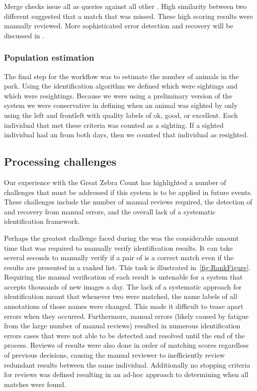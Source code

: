             Merge checks issue all \exemplars{} as queries against all other \exemplars{}. High similarity between
            two different \names{} suggested that a match that was missed. These high scoring results were manually
            reviewed. More sophisticated error detection and recovery will be discussed in .

        \subsubsection{Population estimation}
            The final step for the \GZC{} workflow was to estimate the number of animals in the park.
            Using the identification algorithm we defined which \annots{} were sightings and which were
              resightings.
            Because we were using a preliminary version of the system we were conservative in defining when an
              animal was sighted by only using the left and frontleft \annots{} with quality labels of ok, good, or
              excellent.
            Each individual that met these criteria was counted as a sighting.
            If a sighted individual had an \annot{} from both days, then we counted that individual as resighted.

    \subsection{Processing challenges}
        Our experience with the Great Zebra Count has highlighted a number of challenges that must be addressed if this
        system is to be applied in future events. These challenges include the number of manual reviews required, the
        detection of and recovery from manual errors, and the overall lack of a systematic identification framework.

        Perhaps the greatest challenge faced during the \GZC{} was the
          considerable amount time that was required to manually verify
          identification results.
        It can take several seconds to manually verify if a pair of \annots{}
          is a correct match even if the results are presented in a ranked list.
        This task is illustrated in~\cref{fig:RankFigure}.
        Requiring the manual verification of each result is untenable for a
          system that accepts thousands of new images a day.
        The lack of a systematic approach for identification meant that
          whenever two \annots{} were matched, the name labels of all
          annotations of those names were changed.
        This made it difficult to tease apart errors when they occurred.
        Furthermore, manual errors (likely caused by fatigue from the large
          number of manual reviews) resulted in numerous identification errors
          cases that were not able to be detected and resolved until the end of
          the process.
        Reviews of results were also done in order of matching scores
          regardless of previous decisions, causing the manual reviewer to
          inefficiently review redundant results between the same individual.
        Additionally no stopping criteria for reviews was defined resulting in
          an ad-hoc approach to determining when all matches were found.

